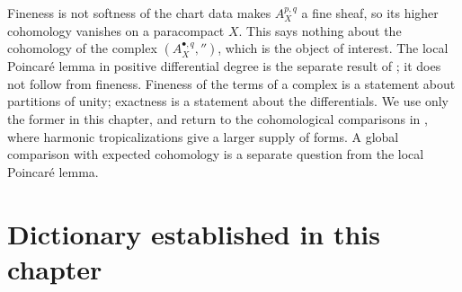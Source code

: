 \begin{warning}{Fineness is not softness of the chart data}
 makes $A^{p,q}_X$ a fine sheaf, so its higher
cohomology vanishes on a paracompact $X$.  This says nothing about the
cohomology of the complex $(A^{\bullet,q}_X,\dprime)$, which is the object of
interest.  The local Poincar\'e lemma in positive differential degree
is the separate result of \cite{Jell16}; it does not follow from
fineness.  Fineness of the terms of a complex
is a statement about partitions of unity; exactness is a statement about
the differentials.  We use only the former in this chapter, and return to the
cohomological comparisons in , where harmonic
tropicalizations give a larger supply of forms.  A global comparison
with expected cohomology is a separate question from the local
Poincar\'e lemma.
\end{warning}

\section{Dictionary established in this chapter}
\label{sec:ch13-dictionary}

